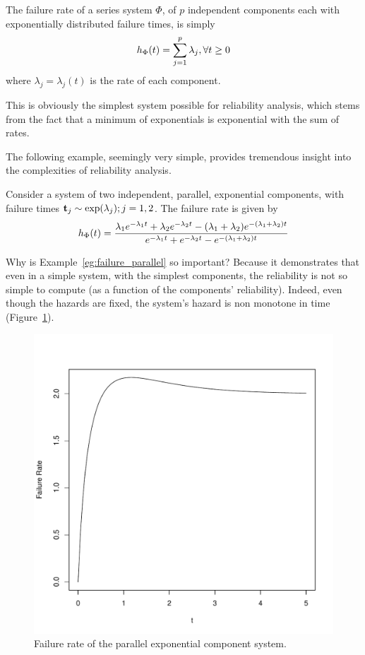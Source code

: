 

\begin{example}
The failure rate of a series system $\Phi$, of $p$ independent components each with exponentially distributed failure times, is simply 
\begin{align}
	h_{\Phi} (t)= \sum_{j=1}^{p} \lambda_j, \forall t \geq 0
\end{align}
where $\lambda_j=\lambda_j(t)$ is the rate of each component.
\end{example}
This is obviously the simplest system possible for reliability analysis, which stems from the fact that a minimum of exponentials is exponential with the sum of rates.



The following example, seemingly very simple, provides tremendous insight into the complexities of reliability analysis.
\begin{example}
\label{eg:failure_parallel}
Consider a system of two independent, parallel, exponential components, with failure times $\mathbf{t}_j\sim \exp(\lambda_j); j=1,2$.
The failure rate is given by
\begin{align}
	h_{\Phi} (t)=
	\frac
	{\lambda_1 e^{-\lambda_1 t} + \lambda_2 e^{-\lambda_2 t}  - (\lambda_1+ \lambda_2) e^{-(\lambda_1+ \lambda_2) t}}
	{e^{-\lambda_1 t} + e^{-\lambda_2 t} - e^{-(\lambda_1+ \lambda_2) t}}
\end{align}
\end{example}
Why is Example~\ref{eg:failure_parallel} so important?
Because it demonstrates that even in a simple system, with the simplest components, the reliability is not so simple to compute (as a function of the components' reliability). 
Indeed, even though the hazards are fixed, the system's hazard is non monotone in time (Figure~\ref{fig:hazard_non_monotone}). 


\begin{figure}[ht]
\centering
\includegraphics[width=0.5\linewidth]{art/hazard}
\caption{Failure rate of the parallel exponential component system.}
\label{fig:hazard_non_monotone}
\end{figure}





